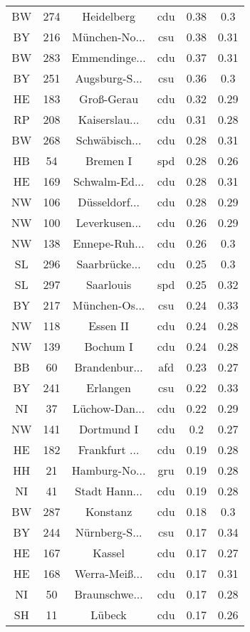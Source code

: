 \begin{table}[!htbp]
\begin{tabular}{@{\extracolsep{5pt}} cccccc}
BW & 274 & Heidelberg & cdu & 0.38 & 0.3 \\ 
BY & 216 & München-No... & csu & 0.38 & 0.31 \\ 
BW & 283 & Emmendinge... & cdu & 0.37 & 0.31 \\ 
BY & 251 & Augsburg-S... & csu & 0.36 & 0.3 \\ 
HE & 183 & Groß-Gerau & cdu & 0.32 & 0.29 \\ 
RP & 208 & Kaiserslau... & cdu & 0.31 & 0.28 \\ 
BW & 268 & Schwäbisch... & cdu & 0.28 & 0.31 \\ 
HB & 54 & Bremen I & spd & 0.28 & 0.26 \\ 
HE & 169 & Schwalm-Ed... & cdu & 0.28 & 0.31 \\ 
NW & 106 & Düsseldorf... & cdu & 0.28 & 0.29 \\ 
NW & 100 & Leverkusen... & cdu & 0.26 & 0.29 \\ 
NW & 138 & Ennepe-Ruh... & cdu & 0.26 & 0.3 \\ 
SL & 296 & Saarbrücke... & cdu & 0.25 & 0.3 \\ 
SL & 297 & Saarlouis & spd & 0.25 & 0.32 \\ 
BY & 217 & München-Os... & csu & 0.24 & 0.33 \\ 
NW & 118 & Essen II & cdu & 0.24 & 0.28 \\ 
NW & 139 & Bochum I & cdu & 0.24 & 0.28 \\ 
BB & 60 & Brandenbur... & afd & 0.23 & 0.27 \\ 
BY & 241 & Erlangen & csu & 0.22 & 0.33 \\ 
NI & 37 & Lüchow-Dan... & cdu & 0.22 & 0.29 \\ 
NW & 141 & Dortmund I & cdu & 0.2 & 0.27 \\ 
HE & 182 & Frankfurt ... & cdu & 0.19 & 0.28 \\ 
HH & 21 & Hamburg-No... & gru & 0.19 & 0.28 \\ 
NI & 41 & Stadt Hann... & cdu & 0.19 & 0.28 \\ 
BW & 287 & Konstanz & cdu & 0.18 & 0.3 \\ 
BY & 244 & Nürnberg-S... & csu & 0.17 & 0.34 \\ 
HE & 167 & Kassel & cdu & 0.17 & 0.27 \\ 
HE & 168 & Werra-Meiß... & cdu & 0.17 & 0.31 \\ 
NI & 50 & Braunschwe... & cdu & 0.17 & 0.28 \\ 
SH & 11 & Lübeck & cdu & 0.17 & 0.26 \\ 

\end{tabular}
\end{table}

